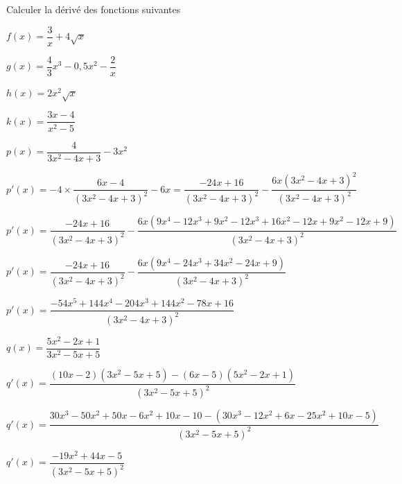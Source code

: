 \documentclass[12pt,a4paper]{article}  %
\begin{document}

Calculer la dérivé des fonctions suivantes
\begin{enumMet}
	\item $f(x)=\dfrac{3}{x}+4 \sqrt{x}$ \quad {} \quad {}
	\item {} $g(x)=\dfrac{4}{3} x^{3}-0,5 x^{2}-\dfrac{2}{x}$\quad {} \quad {}
	\item $h(x)=2 x^{2} \sqrt{x}$ \quad {} \quad {}
	\item $k(x)=\dfrac{3 x-4}{x^{2}-5}$ \quad {} \quad {}
	\item $p(x)=\dfrac{4}{3x^2-4x+3}-3x^2$ \quad {}
	\begin{corrBox}
		$p'(x)=-4\times \dfrac{6x-4}{(3x^2-4x+3)^2}-6x=\dfrac{-24x+16}{(3x^2-4x+3)^2}-\dfrac{6x(3x^2-4x+3)^2}{(3x^2-4x+3)^2}$
		
		$p'(x)=\dfrac{-24x+16}{(3x^2-4x+3)^2}-\dfrac{6x\left(9x^4-12x^3+9x^2-12x^3+16x^2-12x+9x^2-12x+9\right)}{(3x^2-4x+3)^2}$
		
		$p'(x)=\dfrac{-24x+16}{(3x^2-4x+3)^2}-\dfrac{6x\left(9x^4-24x^3+34x^2-24x+9\right)}{(3x^2-4x+3)^2}$
		
		$p'(x)=\dfrac{-54x^5+144x^4-204x^3+144x^2-78x+16}{(3x^2-4x+3)^2}$		
	\end{corrBox}
	\item $q(x)=\dfrac{5x^2-2x+1}{3x^2-5x+5}$ \quad {}
	\begin{corrBox}
		$q'(x)=\dfrac{(10x-2)(3x^2-5x+5)-(6x-5)(5x^2-2x+1)}{(3x^2-5x+5)^2}$		
		
		$q'(x)=\dfrac{30x^3-50x^2+50x-6x^2+10x-10-(30x^3-12x^2+6x-25x^2+10x-5)}{(3x^2-5x+5)^2}$
		
		$q'(x)=\dfrac{-19x^2+44x-5}{(3x^2-5x+5)^2}$
	\end{corrBox}
\end{enumMet}
\end{document}

